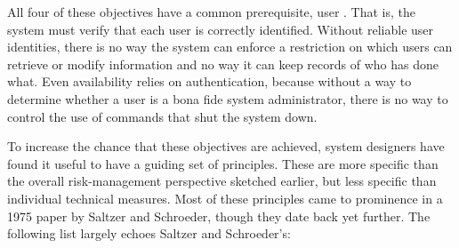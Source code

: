 All four of these objectives have a common prerequisite, user
.  That is, the system must verify that each
user is correctly identified.  Without reliable user identities, there
is no way the system can enforce a restriction on which users can
retrieve or modify information and no way it can keep records of who
has done what.  Even availability relies on authentication, because
without a way to determine whether a user is a bona fide system
administrator, there is no way to control the use of commands that
shut the system down.

To increase the chance that these objectives are achieved, system
designers have found it useful to have a guiding set of principles.
These are more specific than the overall risk-management perspective
sketched earlier, but less specific than individual technical
measures.  Most of these principles came to prominence in a 1975 paper
by Saltzer and Schroeder, though they date back yet further.  The
following list largely echoes Saltzer
and Schroeder's:
